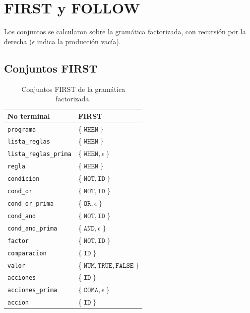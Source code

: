 \documentclass[12pt,a4paper]{article}
\begin{document}
\section{FIRST y FOLLOW}

Los conjuntos se calcularon sobre la gramática factorizada, con recursión por
la derecha ($\epsilon$ indica la producción vacía).

\subsection{Conjuntos FIRST}
\begin{table}[h!]
\centering
\begin{tabular}{ll}
\toprule
\textbf{No terminal} & \textbf{FIRST} \\
\midrule
\texttt{programa}            & \{$\;\texttt{WHEN}\;\}$ \\
\texttt{lista\_reglas}       & \{$\;\texttt{WHEN}\;\}$ \\
\texttt{lista\_reglas\_prima}& \{$\;\texttt{WHEN}, \epsilon\;\}$ \\
\texttt{regla}               & \{$\;\texttt{WHEN}\;\}$ \\
\texttt{condicion}           & \{$\;\texttt{NOT}, \texttt{ID}\;\}$ \\
\texttt{cond\_or}            & \{$\;\texttt{NOT}, \texttt{ID}\;\}$ \\
\texttt{cond\_or\_prima}     & \{$\;\texttt{OR}, \epsilon\;\}$ \\
\texttt{cond\_and}           & \{$\;\texttt{NOT}, \texttt{ID}\;\}$ \\
\texttt{cond\_and\_prima}    & \{$\;\texttt{AND}, \epsilon\;\}$ \\
\texttt{factor}              & \{$\;\texttt{NOT}, \texttt{ID}\;\}$ \\
\texttt{comparacion}         & \{$\;\texttt{ID}\;\}$ \\
\texttt{valor}               & \{$\;\texttt{NUM}, \texttt{TRUE}, \texttt{FALSE}\;\}$ \\
\texttt{acciones}            & \{$\;\texttt{ID}\;\}$ \\
\texttt{acciones\_prima}     & \{$\;\texttt{COMA}, \epsilon\;\}$ \\
\texttt{accion}              & \{$\;\texttt{ID}\;\}$ \\
\bottomrule
\end{tabular}
\caption{Conjuntos FIRST de la gramática factorizada.}
\label{tab:first}
\end{table}
\end{document}
